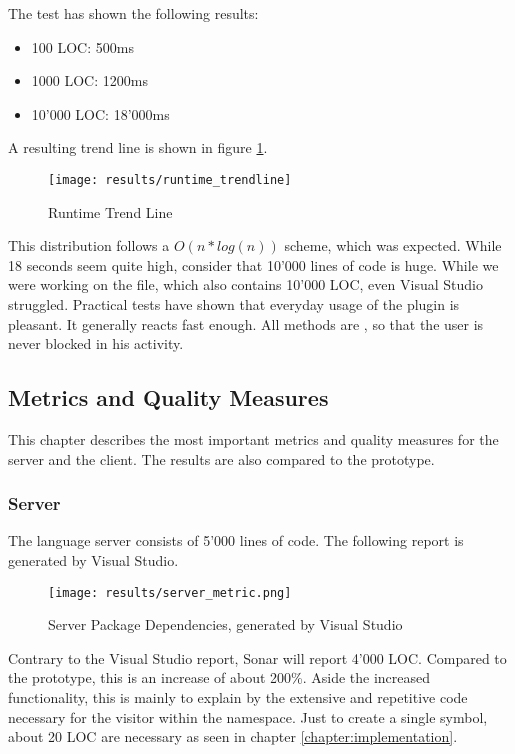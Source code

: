 \pagebreak
The test has shown the following results:

\begin{itemize}
    \item 100 LOC: 500ms
    \item 1000 LOC: 1200ms
    \item 10'000 LOC: 18'000ms
\end{itemize}
A resulting trend line is shown in figure \ref{fig:trendline_1}.

\begin{figure}[H]
    \centering
    \texttt{[image: results/runtime\_trendline]}
    \caption{Runtime Trend Line}
    \label{fig:trendline_1}
\end{figure}

This distribution follows a $O(n*log(n))$ scheme, which was expected.
While 18 seconds seem quite high, consider that 10'000 lines of code is huge.
While we were working on the  file, which also contains 10'000 LOC, even Visual Studio struggled.
Practical tests have shown that everyday usage of the plugin is pleasant.
It generally reacts fast enough.
All methods are , so that the user is never blocked in his activity.

\subsection{Metrics and Quality Measures}
\label{section:results:metrics}
This chapter describes the most important metrics and quality measures for the server and the client.
The results are also compared to the prototype.

\subsubsection{Server}
The language server consists of 5'000 lines of code. The following report is generated by Visual Studio.
\begin{figure}[H]
    \centering
    \texttt{[image: results/server\_metric.png]}
    \caption{Server Package Dependencies, generated by Visual Studio}
    \label{fig:dependency_graph}
\end{figure}
Contrary to the Visual Studio report, Sonar will report 4'000 LOC.
Compared to the prototype, this is an increase of about 200\%.
Aside the increased functionality, this is mainly to explain by the extensive and repetitive code necessary for the visitor within the  namespace.
Just to create a single symbol, about 20 LOC are necessary as seen in chapter \ref{chapter:implementation}.\\

